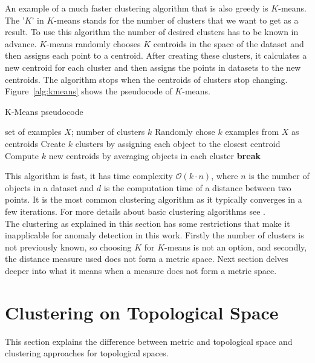 \documentclass[thesis=B,english]{FITthesis}[2012/10/20]
\begin{document}
An example of a much faster clustering algorithm that is also greedy is $K$-means. 
The '$K$' in $K$-means stands for the number of clusters that we want to get as a result.
To use this algorithm the number of desired clusters has to be known in advance.
$K$-means randomly chooses $K$ centroids in the space of the dataset and then assigns each point to a centroid.
After creating these clusters, it calculates a new centroid for each cluster and then assigns the points in datasets to the new centroids.
The algorithm stops when the centroids of clusters stop changing.
Figure~\ref{alg:kmeans} shows the pseudocode of $K$-means.
\begin{algorithm}\label{alg:kmeans}
    \caption{K-Means pseudocode}
    \label{k_mean_pseudocode}
    \begin{algorithmic}[1]
        \INPUT set of examples $X$; number of clusters $k$
        \STATE Randomly chose $k$ examples from $X$ as centroids
            \STATE Create $k$ clusters by assigning each object to the closest centroid
            \STATE Compute $k$ new centroids by averaging objects in each cluster
                \STATE \textbf{break}
            \ENDIF
        \ENDWHILE
    \end{algorithmic}
\end{algorithm} 

This algorithm is fast, it has time complexity $\mathcal{O}(k \cdot n)$, where $n$ is the number of objects in a dataset and $d$ is the computation time of a distance between two points.
It is the most common clustering algorithm as it typically converges in a few iterations.
For more details about basic clustering algorithms see \cite{guttag2016introduction}.\\

The clustering as explained in this section has some restrictions that make it inapplicable for anomaly detection in this work.
Firstly the number of clusters is not previously known, so choosing $K$ for $K$-means is not an option, and secondly, the distance measure used does not form a metric space.
Next section delves deeper into what it means when a measure does not form a metric space.

\section{Clustering on Topological Space}\label{sec:cluster_topo}
This section explains the difference between metric and topological space and clustering approaches for topological spaces. \\
\end{document}
